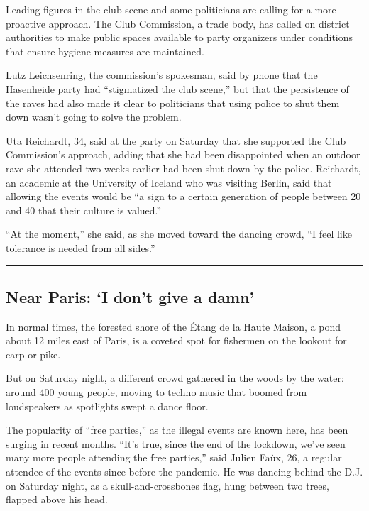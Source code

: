 Leading figures in the club scene and some politicians are calling for a
more proactive approach. The Club Commission, a trade body, has called
on district authorities to make public spaces available to party
organizers under conditions that ensure hygiene measures are maintained.

Lutz Leichsenring, the commission's spokesman, said by phone that the
Hasenheide party had ``stigmatized the club scene,'' but that the
persistence of the raves had also made it clear to politicians that
using police to shut them down wasn't going to solve the problem.

Uta Reichardt, 34, said at the party on Saturday that she supported the
Club Commission's approach, adding that she had been disappointed when
an outdoor rave she attended two weeks earlier had been shut down by the
police. Reichardt, an academic at the University of Iceland who was
visiting Berlin, said that allowing the events would be ``a sign to a
certain generation of people between 20 and 40 that their culture is
valued.''

``At the moment,'' she said, as she moved toward the dancing crowd, ``I
feel like tolerance is needed from all sides.''

\begin{center}\rule{0.5\linewidth}{\linethickness}\end{center}

\hypertarget{near-paris-i-dont-give-a-damn}{%
\subsection{Near Paris: `I don't give a
damn'}\label{near-paris-i-dont-give-a-damn}}

In normal times, the forested shore of the Étang de la Haute Maison, a
pond about 12 miles east of Paris, is a coveted spot for fishermen on
the lookout for carp or pike.

But on Saturday night, a different crowd gathered in the woods by the
water: around 400 young people, moving to techno music that boomed from
loudspeakers as spotlights swept a dance floor.

The popularity of ``free parties,'' as the illegal events are known
here, has been surging in recent months. ``It's true, since the end of
the lockdown, we've seen many more people attending the free parties,''
said Julien Faùx, 26, a regular attendee of the events since before the
pandemic. He was dancing behind the D.J. on Saturday night, as a
skull-and-crossbones flag, hung between two trees, flapped above his
head.

